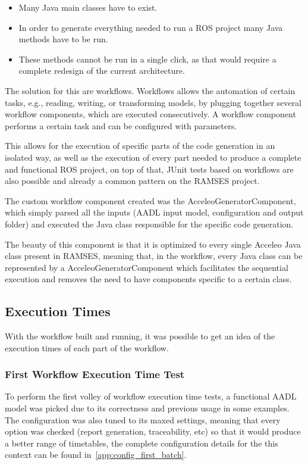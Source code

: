 \begin{itemize} 
	\item Many Java main classes have to exist.
	\item In order to generate everything needed to run a \gls{ROS} project many Java methods have to be run.
	\item These methods cannot be run in a single click, as that would require a complete redesign of the current architecture.
\end{itemize}


The solution for this are workflows. Workflows allows the automation of certain tasks, e.g., reading, writing, or transforming models, by plugging together several workflow components, which are executed consecutively. A workflow component performs a certain task and can be configured with parameters.

This allows for the execution of specific parts of the code generation in an isolated way, as well as the execution of every part needed to produce a complete and functional \gls{ROS} project, on top of that, \gls{JUnit} tests based on workflows are also possible and already a common pattern on the \gls{RAMSES} project.

The custom workflow component created was the AcceleoGeneratorComponent, which simply parsed all the inputs (AADL input model, configuration and output folder) and executed the Java class responsible for the specific code generation.

The beauty of this component is that it is optimized to every single Acceleo Java class present in \gls{RAMSES}, meaning that, in the workflow, every Java class can be represented by a AcceleoGeneratorComponent which facilitates the sequential execution and removes the need to have components specific to a certain class.

\subsection{Execution Times}
\label{sec:exec_times}

With the workflow built and running, it was possible to get an idea of the execution times of each part of the workflow.

\subsubsection{First Workflow Execution Time Test}
\label{sec:exec_times_v1}

To perform the first volley of workflow execution time tests, a functional \gls{AADL} model was picked due to its correctness and previous usage in some examples. The configuration was also tuned to its maxed settings, meaning that every option was checked (report generation, traceability, etc) so that it would produce a better range of timetables, the complete configuration details for the this context can be found in~\ref{app:config_first_batch}.


